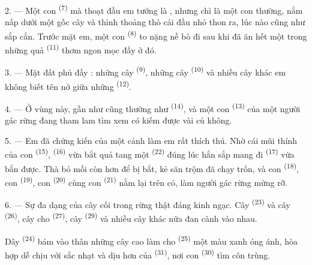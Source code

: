 2. --- Một con  \textsuperscript{(7)} mà thoạt đầu em tưởng là , nhưng chỉ là một con  thường, nằm nấp dưới một gốc cây và thỉnh
thoảng thò cái đầu nhỏ thon ra, lúc nào cũng như sắp cắn. Trước mặt em, một con
 \textsuperscript{(8)} to nặng nề bò đi sau khi đã ăn hết một trong
những quả  \textsuperscript{(11)} thơm ngon mọc đầy ở đó.

3. --- Mặt đất phủ đầy  : những cây 
\textsuperscript{(9)}, những cây  \textsuperscript{(10)} và nhiều cây
khác em không biết tên nở giữa những  \textsuperscript{(12)}.

4. --- Ở vùng này,  gần như cũng thường như 
\textsuperscript{(14)}, và một con  \textsuperscript{(13)} của một người
gác rừng đang tham lam tìm xem có kiếm được vài củ không.

\VUsaut{3.0mm}
\VUsaut{3.0mm}

5. --- Em đã chứng kiến  của một cảnh làm em rất thích thú. Nhờ cái mũi
thính của con  \textsuperscript{(15)}, 
\textsuperscript{(16)} vừa bắt quả tang một  \textsuperscript{(22)}
đúng lúc hắn sắp mang đi  \textsuperscript{(17)} vừa bắn được. Thà bỏ mồi
còn hơn để bị bắt, kẻ săn trộm đã chạy trốn, và con 
\textsuperscript{(18)}, con  \textsuperscript{(19)}, con 
\textsuperscript{(20)} cùng con  \textsuperscript{(21)} nằm lại trên cỏ,
làm người gác rừng mừng rỡ.

6. --- Sự đa dạng của cây cối trong rừng thật đáng kinh ngạc. Cây 
\textsuperscript{(23)} và cây  \textsuperscript{(26)}, cây
 cho  \textsuperscript{(27)}, cây 
\textsuperscript{(29)} và nhiều cây khác nữa đan cành vào nhau.

Dây  \textsuperscript{(24)} bám vào thân những cây cao làm cho
 \textsuperscript{(25)} một màu xanh óng ánh, hòa hợp dễ chịu với
sắc nhạt và dịu hơn của  \textsuperscript{(31)}, nơi con  \textsuperscript{(30)} tìm côn trùng.

\VUsaut{3.0mm}
\VUsaut{3.0mm}


